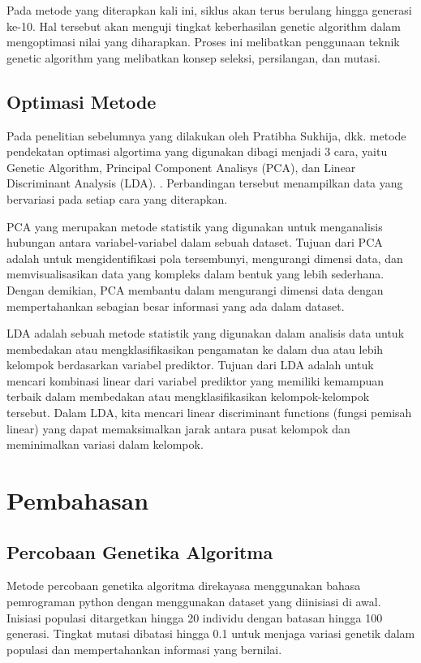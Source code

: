 \documentclass[conference]{IEEEtran}
\begin{document}
Pada metode yang diterapkan kali ini, siklus akan terus berulang hingga generasi ke-10. Hal tersebut akan menguji tingkat keberhasilan genetic algorithm dalam mengoptimasi nilai yang diharapkan. Proses ini melibatkan penggunaan teknik genetic algorithm yang melibatkan konsep seleksi, persilangan, dan mutasi. 

\subsection{Optimasi Metode}

Pada penelitian sebelumnya yang dilakukan oleh Pratibha Sukhija, dkk. metode pendekatan optimasi algortima yang digunakan dibagi menjadi 3 cara, yaitu Genetic Algorithm, Principal Component Analisys (PCA), dan Linear Discriminant Analysis (LDA). \cite{Sukhija2016}. Perbandingan tersebut menampilkan data yang bervariasi pada setiap cara yang diterapkan.

PCA yang merupakan metode statistik yang digunakan untuk menganalisis hubungan antara variabel-variabel dalam sebuah dataset. Tujuan dari PCA adalah untuk mengidentifikasi pola tersembunyi, mengurangi dimensi data, dan memvisualisasikan data yang kompleks dalam bentuk yang lebih sederhana. Dengan demikian,  PCA membantu dalam mengurangi dimensi data dengan mempertahankan sebagian besar informasi yang ada dalam dataset.

LDA adalah sebuah metode statistik yang digunakan dalam analisis data untuk membedakan atau mengklasifikasikan pengamatan ke dalam dua atau lebih kelompok berdasarkan variabel prediktor. Tujuan dari LDA adalah untuk mencari kombinasi linear dari variabel prediktor yang memiliki kemampuan terbaik dalam membedakan atau mengklasifikasikan kelompok-kelompok tersebut. Dalam LDA, kita mencari linear discriminant functions (fungsi pemisah linear) yang dapat memaksimalkan jarak antara pusat kelompok dan meminimalkan variasi dalam kelompok. 




\section{Pembahasan}

\subsection{Percobaan Genetika Algoritma}

Metode percobaan genetika algoritma direkayasa menggunakan bahasa pemrograman python dengan menggunakan dataset yang diinisiasi di awal. Inisiasi populasi ditargetkan hingga 20 individu dengan batasan hingga 100 generasi. Tingkat mutasi dibatasi hingga 0.1 untuk menjaga variasi genetik dalam populasi dan mempertahankan informasi yang bernilai.
\end{document}
